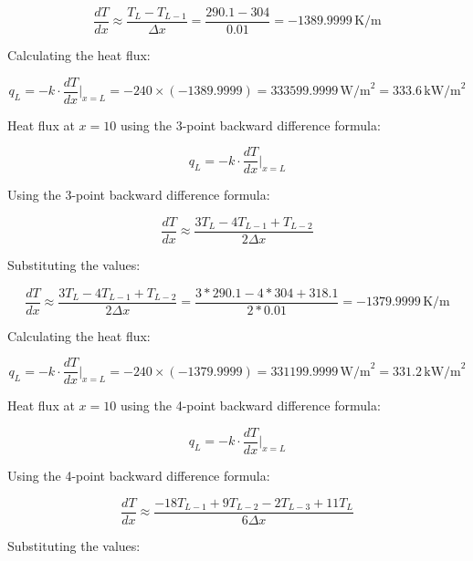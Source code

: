 \documentclass[12pt, a4paper]{article}
\numberwithin{equation}{section}
\begin{document}
\begin{equation}
\frac{dT}{dx} \approx \frac{T_L - T_{L-1}}{\Delta x} = \frac{290.1 - 304}{0.01} = -1389.9999\, \text{K/m}
\end{equation}

Calculating the heat flux:

\begin{equation}
q_L = -k \cdot \frac{dT}{dx}\Bigg|_{x=L} = -240 \times (-1389.9999) = 333599.9999\, \text{W/m}^2 = 333.6\, \text{kW/m}^2
\end{equation}

Heat flux at \(x = 10\) using the 3-point backward difference formula:

\begin{equation}
q_L = -k \cdot \frac{d T}{d x}\Bigg|_{x=L}
\end{equation}

Using the 3-point backward difference formula:

\begin{equation}
\frac{d T}{d x} \approx \frac{3T_L - 4T_{L-1} + T_{L-2}}{2\Delta x}
\end{equation}

Substituting the values:

\begin{equation}
\frac{dT}{dx} \approx \frac{3T_L - 4T_{L-1} + T_{L-2}}{2\Delta x} = \frac{3*290.1 - 4*304 + 318.1}{2*0.01} = -1379.9999\, \text{K/m}
\end{equation}

Calculating the heat flux:

\begin{equation}
q_L = -k \cdot \frac{dT}{dx}\Bigg|_{x=L} = -240 \times (-1379.9999) = 331199.9999\, \text{W/m}^2 = 331.2\, \text{kW/m}^2
\end{equation}

Heat flux at \(x = 10\) using the 4-point backward difference formula:

\begin{equation}
q_L = -k \cdot \frac{d T}{d x}\Bigg|_{x=L}
\end{equation}

Using the 4-point backward difference formula:

\begin{equation}
\frac{d T}{d x} \approx \frac{-18T_{L-1} + 9T_{L-2} - 2T_{L-3} + 11T_L}{6\Delta x}
\end{equation}

Substituting the values:
\end{document}
